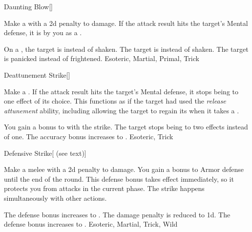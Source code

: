 \lowercase{\hypertarget{maneuver:Daunting Blow}{}}\label{maneuver:Daunting Blow}
\hypertarget{maneuver:Daunting Blow}{}
\begin{freeability}[Rank 1]{Daunting Blow}[]

Make a  with a \minus2d penalty to damage.
If the attack result hits the target's Mental defense,
it is  by you as a .

\rankline
{} On a , the target is  instead of shaken.
 The target is  instead of shaken.
 The target is panicked instead of frightened.
 Esoteric, Martial, Primal, Trick
\end{freeability}
\vspace{0.25em}



\lowercase{\hypertarget{maneuver:Deattunement Strike}{}}\label{maneuver:Deattunement Strike}
\hypertarget{maneuver:Deattunement Strike}{}
\begin{freeability}[Rank 1]{Deattunement Strike}[]

Make a .
If the attack result hits the target's Mental defense,
it stops being  to one effect of its choice.
This functions as if the target had used the \textit{release attunement} ability,
including allowing the target to regain its  when it takes a .

\rankline
{} You gain a  bonus to  with the strike.
 The target stops being  to two effects instead of one.
 The accuracy bonus increases to .
 Esoteric, Trick
\end{freeability}
\vspace{0.25em}



\lowercase{\hypertarget{maneuver:Defensive Strike}{}}\label{maneuver:Defensive Strike}
\hypertarget{maneuver:Defensive Strike}{}
\begin{freeability}[Rank 1]{Defensive Strike}[ (see text)]

Make a melee  with a \minus2d penalty to damage.
You gain a  bonus to Armor defense until the end of the round.
This defense bonus takes effect immediately, so it protects you from attacks in the current phase.
The strike happens simultaneously with other actions.

\rankline
{} The defense bonus increases to .
 The damage penalty is reduced to \minus1d.
 The defense bonus increases to .
 Esoteric, Martial, Trick, Wild
\end{freeability}
\vspace{0.25em}



